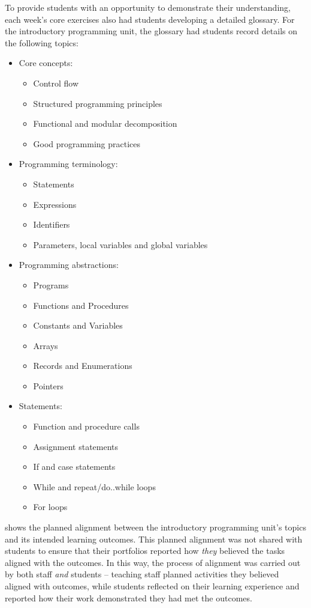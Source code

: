 To provide students with an opportunity to demonstrate their understanding, each week's core exercises also had students developing a detailed glossary. For the introductory programming unit, the glossary had students record details on the following topics:
\begin{itemize}[noitemsep, nolistsep]
	\item Core concepts:
	\begin{itemize}[noitemsep, nolistsep]
		\item Control flow
		\item Structured programming principles
		\item Functional and modular decomposition
		\item Good programming practices
	\end{itemize}
	\item Programming terminology:
	\begin{itemize}[noitemsep, nolistsep]
		\item Statements
		\item Expressions
		\item Identifiers
		\item Parameters, local variables and global variables
	\end{itemize}
	\item Programming abstractions:
	\begin{itemize}[noitemsep, nolistsep]
		\item Programs
		\item Functions and Procedures
		\item Constants and Variables
		\item Arrays
		\item Records and Enumerations
		\item Pointers
	\end{itemize}
	\item Statements:
	\begin{itemize}[noitemsep, nolistsep]
		\item Function and procedure calls
		\item Assignment statements
		\item If and case statements
		\item While and repeat/do..while loops
		\item For loops
	\end{itemize}
\end{itemize}

 shows the planned alignment between the introductory programming unit's topics and its intended learning outcomes. This planned alignment was not shared with students to ensure that their portfolios reported how \emph{they} believed the tasks aligned with the outcomes. In this way, the process of alignment was carried out by both staff \emph{and} students -- teaching staff planned activities they believed aligned with outcomes, while students reflected on their learning experience and reported how their work demonstrated they had met the outcomes. 

